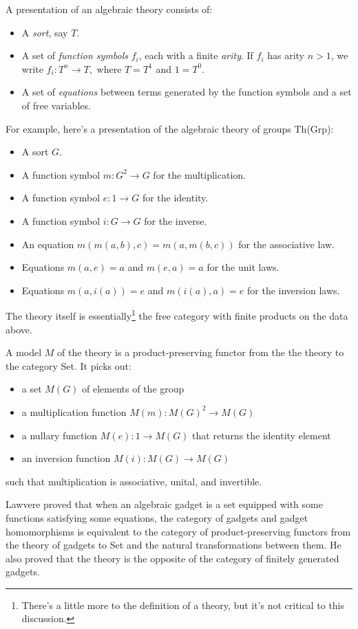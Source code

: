 \documentclass{article}
\begin{document}
A presentation of an algebraic theory consists of:
\begin{itemize}
    \item A {\em sort}, say $T.$
    \item A set of {\em function symbols} $f_i$, each with a finite {\em arity}.  If $f_i$ has arity $n > 1$, we write $f_i:T^n \to T,$ where $T = T^1$ and $1 = T^0.$
    \item A set of {\em equations} between terms generated by the function symbols and a set of free variables.
\end{itemize}
For example, here's a presentation of the algebraic theory of groups Th(Grp):
\begin{itemize}
    \item A sort $G.$
    \item A function symbol $m\colon G^2 \to G$ for the multiplication.
    \item A function symbol $e\colon 1 \to G$ for the identity.
    \item A function symbol $i\colon G \to G$ for the inverse.
    \item An equation $m(m(a,b),c) = m(a, m(b,c))$ for the associative law.
    \item Equations $m(a, e) = a$ and $m(e, a) = a$ for the unit laws.
    \item Equations $m(a, i(a)) = e$ and $m(i(a), a) = e$ for the inversion laws.
\end{itemize}
The theory itself is essentially\footnote{There's a little more to the definition of a theory, but it's not critical to this discussion.} the free category with finite products on the data above.

A model $M$ of the theory is a product-preserving functor from the the theory to the category Set.  It picks out:
\begin{itemize}
    \item a set $M(G)$ of elements of the group
    \item a multiplication function $M(m)\colon M(G)^2 \to M(G)$
    \item a nullary function $M(e): 1 \to M(G)$ that returns the identity element
    \item an inversion function $M(i): M(G) \to M(G)$
\end{itemize}
such that multiplication is associative, unital, and invertible.

Lawvere proved that when an algebraic gadget is a set equipped with some functions satisfying some equations, the category of gadgets and gadget homomorphisms is equivalent to the category of product-preserving functors from the theory of gadgets to Set and the natural transformations between them.  He also proved that the theory is the opposite of the category of finitely generated gadgets.
\end{document}
